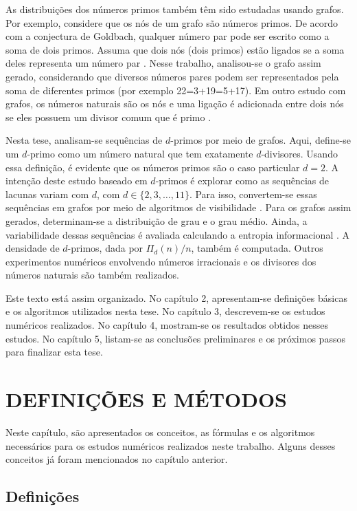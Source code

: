 \documentclass[12pt,a4paper,fleqn]{report}
\begin{document}
As distribuições dos números primos também têm sido estudadas usando grafos. Por exemplo, considere que
os nós de um grafo são números primos. De acordo com 
a conjectura de Goldbach,
qualquer número par pode ser
escrito como a soma de dois primos. Assuma que dois nós (dois primos) estão
ligados se a soma deles representa um número par \cite{a04}. Nesse trabalho, analisou-se o grafo assim gerado, considerando que  diversos números pares podem ser representados pela soma de diferentes primos (por exemplo 22=3+19=5+17). Em outro estudo com grafos, os números naturais são os nós
e uma ligação é adicionada entre dois nós se eles possuem um divisor comum que é
primo \cite{a16}. 

Nesta tese, analisam-se sequências de $d$-primos por meio de grafos. Aqui, define-se um $d$-primo como um número natural que tem exatamente $d$-divisores.
Usando essa definição, é evidente que os números primos são o caso particular 
$d=2$. 
A intenção deste estudo baseado em $d$-primos é explorar como
as sequências de lacunas
variam com $d$, com $d \in \{2,3,\ldots,11\}$. Para isso, convertem-se essas sequências em grafos por meio de algoritmos de visibilidade \cite{a14,a13}.
Para os grafos assim gerados, determinam-se a distribuição de grau e o grau médio. Ainda, a variabilidade dessas sequências é avaliada calculando a entropia informacional \cite{a301}. A densidade de $d$-primos, dada por $\Pi_d(n)/n$, também é computada. Outros experimentos numéricos envolvendo números irracionais e os divisores dos números naturais são também realizados. 

Este texto está assim organizado. No capítulo 2, apresentam-se definições básicas e os algoritmos utilizados nesta tese. No capítulo 3, descrevem-se os estudos numéricos realizados. No capítulo 4, mostram-se os resultados  obtidos nesses estudos. No capítulo 5, listam-se as conclusões preliminares e os próximos passos para finalizar esta tese. 



\chapter{DEFINIÇÕES E MÉTODOS}

Neste capítulo, são apresentados os conceitos, as fórmulas e os algoritmos necessários
para os estudos numéricos realizados neste trabalho. Alguns desses conceitos já foram mencionados no capítulo anterior.

\section{Definições}
\end{document}
